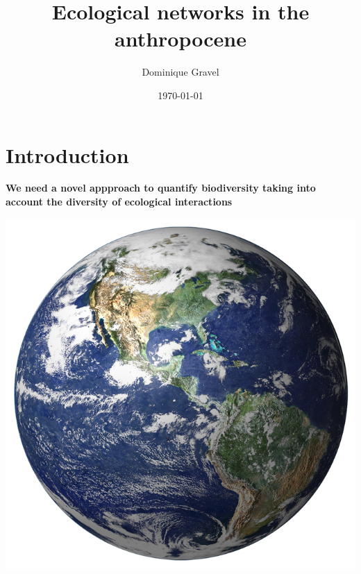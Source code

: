 \documentclass{eecslides}
\title[Networks \& Biogeography]{Ecological networks in the anthropocene}
\author[D. Gravel]{Dominique Gravel}
\institute{UQAR -- Canada Research Chair in Biogeography and metacommunity ecology}
\date{\today}
\begin{document}
	\begin{frame}[plain] 
		\titlepage
	\end{frame}

	\section{Introduction}

	\begin{frame}
		\begin{center}
			\alert{\large{\textbf{We need a novel appproach to quantify biodiversity taking into account the diversity of ecological interactions}}}\\
		\end{center}	  	    
	\end{frame}


	\begin{frame}
		\begin{center}
		\includegraphics[height=0.8\textheight]{earth}\\
		\end{center}
	\end{frame}
\end{document}
